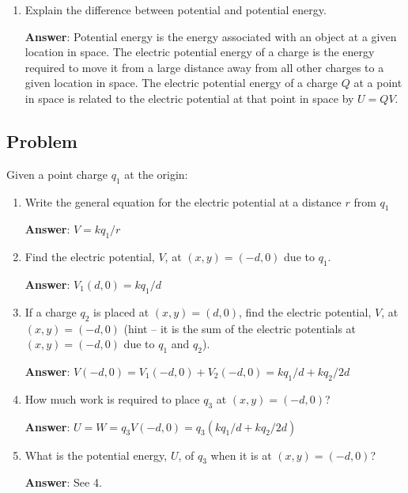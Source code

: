 \documentclass{article}
\begin{document}
\begin{enumerate}
  \item Explain the difference between potential and potential energy.

        \ifsolutions
        {\bf Answer}: Potential energy is the energy associated with an object at a given location in space. The electric potential energy of a charge is the energy required to move it from a large distance away from all other charges to a given location in space. The electric potential energy of a charge $Q$ at a point in space is related to the electric potential at that point in space by $U=QV$.
        \else

        \vskip 48pt
        \fi

\end{enumerate}

\newpage

\subsection{Problem}

Given a point charge $q_1$ at the origin:

\begin{enumerate}

  \item Write the general equation for the electric potential at a distance $r$ from $q_1$

        \ifsolutions
        \textbf{Answer}:
        $V=kq_1/r$
        \else

        \vskip 36pt
        \fi

  \item Find the electric potential, $V$, at $(x,y) = (-d,0)$ due to $q_1$.

        \ifsolutions
        \textbf{Answer}:
        $V_1(d,0)=kq_1/d$
        \else

        \vskip 36pt
        \fi

  \item If a charge $q_2$ is placed at $(x,y) = (d,0)$, find the electric potential, $V$, at $(x,y) = (-d,0)$ (hint -- it is the sum of the electric potentials at $(x,y)=(-d, 0)$ due to $q_1$ and $q_2$).

        \ifsolutions
        \textbf{Answer}:
        $V(-d,0)=V_1(-d,0)+V_2(-d,0) = kq_1/d + kq_2/2d$
        \else

        \vskip 36pt
        \fi

  \item How much work is required to place $q_3$ at $(x,y) = (-d,0)$?

        \ifsolutions
        \textbf{Answer}:
        $U=W=q_3V(-d,0)=q_3(kq_1/d + kq_2/2d)$
        \else

        \vskip 36pt
        \fi

  \item What is the potential energy, $U$, of $q_3$ when it is at $(x,y) = (-d,0)$?

        \ifsolutions
        \textbf{Answer}:
        See 4.
        \else

        \vskip 36pt
        \fi

\end{enumerate}
\end{document}
